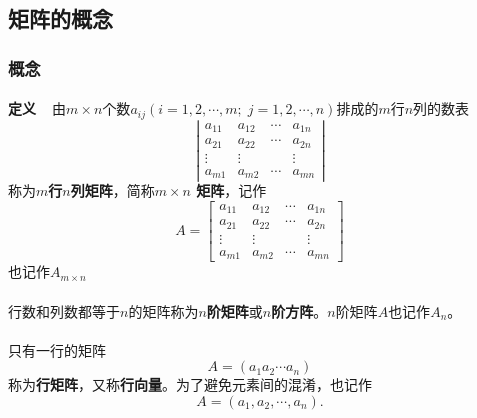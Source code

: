 \subsection{矩阵的概念}
\subsubsection{概念}
\paragraph{}
\textbf{定义~~}由$m\times n$个数$a_{ij} (i=1,2,\cdots,m; \; j =1,2,\cdots,n)$排成的$m$行$n$列的数表
\begin{equation*}
  \left|\begin{array}{cccc}
    a_{11} & a_{12} & \cdots & a_{1n} \\
    a_{21} & a_{22} & \cdots & a_{2n} \\
    \vdots & \vdots &  & \vdots \\
    a_{m1} & a_{m2} & \cdots & a_{mn}
  \end{array} \right|
\end{equation*}
称为\textbf{$m$行$n$列矩阵}，简称\textbf{$m \times n$ 矩阵}，记作
\begin{equation}
  A = \left[\begin{array}{cccc}
  a_{11} & a_{12} & \cdots & a_{1n} \\
  a_{21} & a_{22} & \cdots & a_{2n} \\
  \vdots & \vdots &  & \vdots \\
  a_{m1} & a_{m2} & \cdots & a_{mn}
\end{array} \right]
\end{equation}
也记作$A_{m\times n}$

\paragraph{}
行数和列数都等于$n$的矩阵称为\textbf{$n$阶矩阵}或\textbf{$n$阶方阵}。$n$阶矩阵$A$也记作$A_n$。

\paragraph{}
只有一行的矩阵
\begin{equation*}
  A = (a_1a_2\cdots a_n)
\end{equation*}
称为\textbf{行矩阵}，又称\textbf{行向量}。为了避免元素间的混淆，也记作
\begin{equation*}
  A = (a_1,a_2,\cdots,a_n).
\end{equation*}

